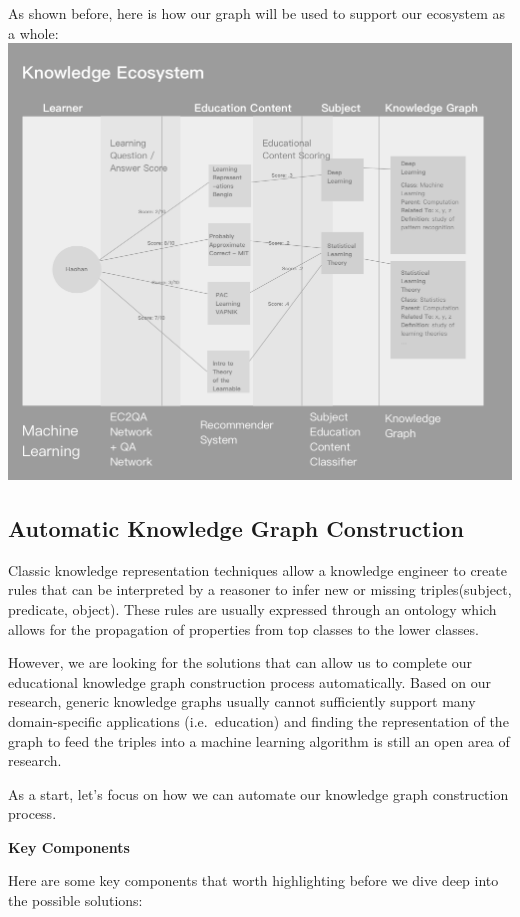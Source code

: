 \documentclass[]{book}
\theoremstyle{definition}
\theoremstyle{definition}
\theoremstyle{definition}
\theoremstyle{remark}
\begin{document}
As shown before, here is how our graph will be used to support our
ecosystem as a whole: \includegraphics{img/knowledgeEcosystem.png}

\subsection{Automatic Knowledge Graph
Construction}\label{automatic-knowledge-graph-construction}

Classic knowledge representation techniques allow a knowledge engineer
to create rules that can be interpreted by a reasoner to infer new or
missing triples(subject, predicate, object). These rules are usually
expressed through an ontology which allows for the propagation of
properties from top classes to the lower classes.

However, we are looking for the solutions that can allow us to complete
our educational knowledge graph construction process automatically.
Based on our research, generic knowledge graphs usually cannot
sufficiently support many domain-specific applications (i.e.~education)
and finding the representation of the graph to feed the triples into a
machine learning algorithm is still an open area of research.

As a start, let's focus on how we can automate our knowledge graph
construction process.

\textbf{Key Components}

Here are some key components that worth highlighting before we dive deep
into the possible solutions:
\end{document}
